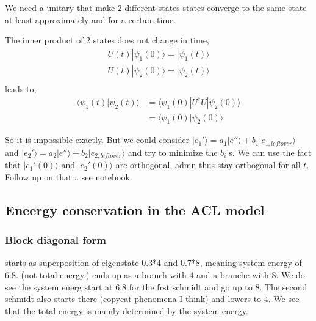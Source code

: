 \documentclass{article}
\begin{document}
We need a unitary that make 2 different states states converge to the same state at least approximately and for a certain time. 

The inner product of 2 states does not change in time,
\begin{eqnarray}
    U(t)|\psi_1(0)\rangle=|\psi_1(t)\rangle\\
    U(t)|\psi_2(0)\rangle=|\psi_2(t)\rangle\\
\end{eqnarray}
leads to,
\begin{eqnarray}
    \langle\psi_1(t)|\psi_2(t)\rangle&=\langle\psi_1(0)|U^{\dagger}U|\psi_2(0)\rangle\\
    &=\langle\psi_1(0)|\psi_2(0)\rangle
\end{eqnarray}

So it is impossible exactly. But we could consider $|e_1'\rangle=a_1|e''\rangle+b_1|e_{1,leftover}\rangle$ and $|e_2'\rangle=a_2|e''\rangle+b_2|e_{2,leftover}\rangle$ and try to minimize the $b_i$'s. 
We can use the fact that $|e_1'(0)\rangle$ and $|e_2'(0)\rangle$ are orthogonal, admn thus stay orthogonal for all $t$. 
Follow up on that... see notebook.

\subsection*{Eneergy conservation in the ACL model}


\subsubsection{Block diagonal form}

starts as superposition of eigenstate 0.3*4 and 0.7*8, meaning system energy of 6.8. (not total energy.) ends up as a branch with 4 and a branche with 8. 
We do see the system energ start at 6.8 for the frst schmidt and go up to 8. 
The second schmidt also starts there (copycat phenomena I think) and lowers to 4.
We see that the total energy is mainly determined by the system energy.
\end{document}
